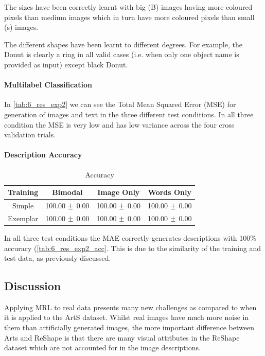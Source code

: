The sizes have been correctly learnt with big (B) images having more coloured pixels than medium images which in turn have more coloured pixels than small (s) images.

The different shapes have been learnt to different degrees. For example, the Donut is clearly a ring in all valid cases (i.e. when only one object name is provided as input) except black Donut.



\paragraph{Multilabel Classification}



In \autoref{tab:6_res_exp2} we can see the Total Mean Squared Error (MSE) for generation of images and text in the three different test conditions. In all three condition the MSE is very low and has low variance across the four cross validation trials.

\paragraph{Description Accuracy}
\begin{table}[h!]
\centering
	\begin{tabular}{|c|c|c|c|}
	\hline
\textbf{Training}	 & 	\textbf{Bimodal} & \textbf{Image Only} 	& 	\textbf{Words Only} \\ \hline
Simple &  100.00 $\mypm$ 0.00 & 100.00 $\mypm$ 0.00 & 100.00 $\mypm$ 0.00 \\ \hline
Exemplar & 100.00 $\mypm$ 0.00 & 100.00 $\mypm$ 0.00 & 100.00 $\mypm$ 0.00 \\ \hline
\end{tabular}
\caption{Accuracy}
\label{tab:6_res_exp2_acc}
\end{table}


In all three test conditions the MAE correctly generates descriptions with 100\% accuracy (\autoref{tab:6_res_exp2_acc}. This is due to the similarity of the training and test data, as previously discussed.

\subsection{Discussion}

Applying MRL to real data presents many new challenges as compared to when it is applied to the ArtS dataset. Whilst real images have much more noise in them than artificially generated images, the more important difference between Arts and ReShape is that there are many visual attributes in the ReShape dataset which are not accounted for in the image descriptions.

